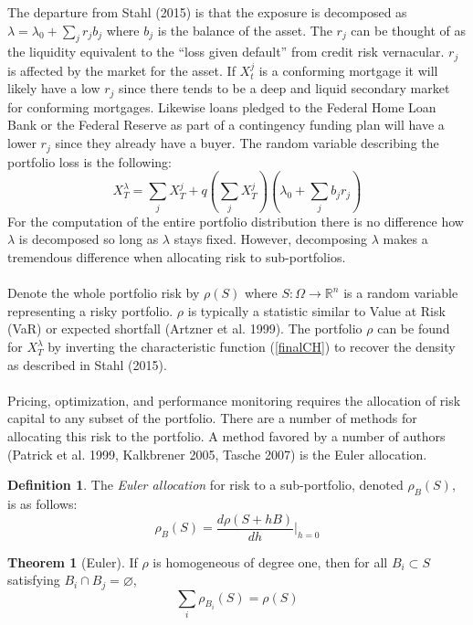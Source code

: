 \documentclass[12pt]{article}
\theoremstyle{definition}
\newtheorem{riskmeasure}{Definition}
\newtheorem{theorem}{Theorem}
\begin{document}
The departure from Stahl (2015) is that the exposure is decomposed as \(\lambda=\lambda_0+\sum_j r_j b_j\) where \(b_j\) is the balance of the asset.  The \(r_j\) can be thought of as the liquidity equivalent to the ``loss given default'' from credit risk vernacular.  \(r_j\) is affected by the market for the asset.  If \(X_t ^ j\) is a conforming mortgage it will likely have a low \(r_j\) since there tends to be a deep and liquid secondary market for conforming mortgages.  Likewise loans pledged to the Federal Home Loan Bank or the Federal Reserve as part of a contingency funding plan will have a lower \(r_j\) since they already have a buyer.  The random variable describing the portfolio loss is the following:
\begin{equation}X_T ^ \lambda=\sum_j X_T ^ j+q\left(\sum_j X_T ^ j\right)\left(\lambda_0+\sum_j b_j r_j\right)\end{equation}
For the computation of the entire portfolio distribution there is no difference how \(\lambda\) is decomposed so long as \(\lambda\) stays fixed.  However, decomposing \(\lambda\) makes a tremendous difference when allocating risk to sub-portfolios.  
\\
\\
Denote the whole portfolio risk by \(\rho(S)\) where \(S: \Omega \to \mathbb{R} ^ n \) is a random variable representing a risky portfolio.  \(\rho\) is typically a statistic similar to Value at Risk (VaR) or expected shortfall (Artzner et al. 1999).  The portfolio \(\rho\) can be found for \(X_T ^ \lambda\) by inverting the characteristic function (\ref{finalCH}) to recover the density as described in Stahl (2015). 
\\
\\
 Pricing, optimization, and performance monitoring requires the allocation of risk capital to any subset of the portfolio.  There are a number of methods for allocating this risk to the portfolio.  A method favored by a number of authors (Patrick et al. 1999, Kalkbrener 2005, Tasche 2007) is the Euler allocation.  

\begin{riskmeasure}
The \emph{Euler allocation} for risk to a sub-portfolio, denoted \(\rho_B(S)\), is as follows:
 \[ \rho_B(S)=\frac{d\rho(S+hB)}{dh} \bigg|_{h=0}\]
\end{riskmeasure}


\begin{theorem}[Euler] \label{euler}
If \(\rho\) is homogeneous of degree one, then for all \(B_i \subset S\) satisfying  \(B_i \cap B_j =\varnothing\), 
\begin{equation}
\sum_i \rho_{B_i} (S) =\rho (S)
\end{equation}
\end{theorem}
\end{document}
